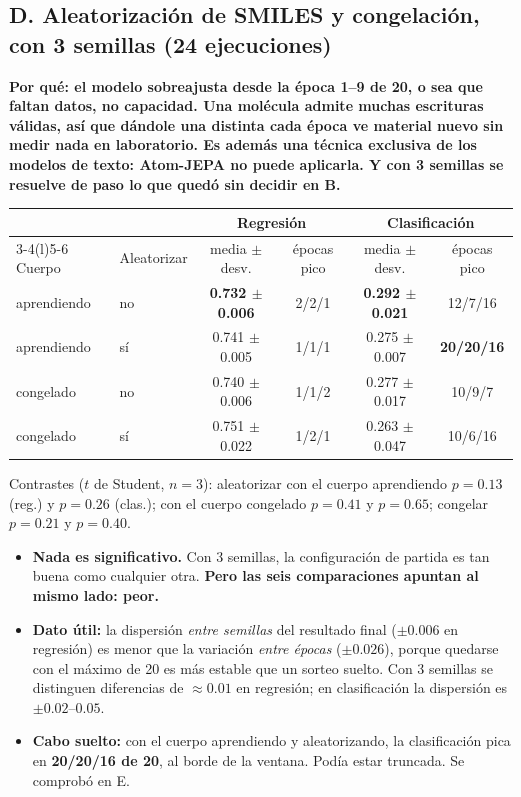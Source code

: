 \documentclass[11pt,a4paper]{article}
\newcommand{\exper}[2]{\subsection*{#1}\noindent\textbf{\small\textcolor{dtured}{#2}}\par\smallskip}
\begin{document}
\exper{D. Aleatorización de SMILES y congelación, con 3 semillas (24 ejecuciones)}
{Por qué: el modelo sobreajusta desde la época 1--9 de 20, o sea que faltan datos, no capacidad. Una molécula admite muchas escrituras válidas, así que dándole una distinta cada época ve material nuevo sin medir nada en laboratorio. Es además una técnica exclusiva de los modelos de texto: Atom-JEPA no puede aplicarla. Y con 3 semillas se resuelve de paso lo que quedó sin decidir en B.}

\begin{center}
\begin{tabular}{llcc@{\qquad}cc}
\toprule
& & \multicolumn{2}{c}{Regresión} & \multicolumn{2}{c}{Clasificación} \\
\cmidrule(r){3-4}\cmidrule(l){5-6}
Cuerpo & Aleatorizar & media $\pm$ desv. & épocas pico & media $\pm$ desv. & épocas pico \\ \midrule
aprendiendo & no & \textbf{0.732 $\pm$ 0.006} & 2/2/1 & \textbf{0.292 $\pm$ 0.021} & 12/7/16 \\
aprendiendo & sí & 0.741 $\pm$ 0.005 & 1/1/1 & 0.275 $\pm$ 0.007 & \textbf{20/20/16} \\
congelado & no & 0.740 $\pm$ 0.006 & 1/1/2 & 0.277 $\pm$ 0.017 & 10/9/7 \\
congelado & sí & 0.751 $\pm$ 0.022 & 1/2/1 & 0.263 $\pm$ 0.047 & 10/6/16 \\
\bottomrule
\end{tabular}
\end{center}

\noindent Contrastes ($t$ de Student, $n=3$): aleatorizar con el cuerpo aprendiendo $p=0.13$ (reg.)
y $p=0.26$ (clas.); con el cuerpo congelado $p=0.41$ y $p=0.65$; congelar $p=0.21$ y $p=0.40$.

\begin{concl}
\begin{itemize}
  \item \textbf{Nada es significativo.} Con 3 semillas, la configuración de partida es tan buena como
        cualquier otra. \textbf{Pero las seis comparaciones apuntan al mismo lado: peor.}
  \item \textbf{Dato útil:} la dispersión \emph{entre semillas} del resultado final ($\pm0.006$ en
        regresión) es menor que la variación \emph{entre épocas} ($\pm0.026$), porque quedarse con el
        máximo de 20 es más estable que un sorteo suelto. Con 3 semillas se distinguen diferencias de
        $\approx0.01$ en regresión; en clasificación la dispersión es $\pm0.02$--$0.05$.
  \item \textbf{Cabo suelto:} con el cuerpo aprendiendo y aleatorizando, la clasificación pica en
        \textbf{20/20/16 de 20}, al borde de la ventana. Podía estar truncada. Se comprobó en E.
\end{itemize}
\end{concl}
\end{document}
